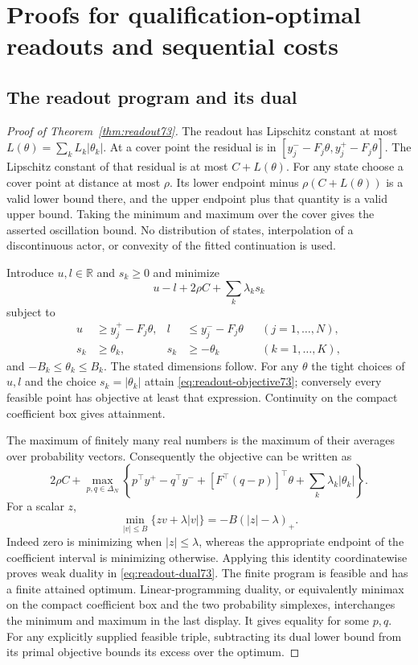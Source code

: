 \section{Proofs for qualification-optimal readouts and sequential costs}\label{supp:proofs73}
\subsection{The readout program and its dual}\label{supp:readout73}
\begin{proof}[Proof of Theorem~\ref{thm:readout73}]
The readout has Lipschitz constant at most $L(\theta)=\sum_kL_k|\theta_k|$. At a cover point the residual is in $[y_j^--F_j\theta,y_j^+-F_j\theta]$. The Lipschitz constant of that residual is at most $C+L(\theta)$. For any state choose a cover point at distance at most $\rho$. Its lower endpoint minus $\rho(C+L(\theta))$ is a valid lower bound there, and the upper endpoint plus that quantity is a valid upper bound. Taking the minimum and maximum over the cover gives the asserted oscillation bound. No distribution of states, interpolation of a discontinuous actor, or convexity of the fitted continuation is used.

Introduce $u,l\in\mathbb R$ and $s_k\ge0$ and minimize
\[
 u-l+2\rho C+\sum_k\lambda_ks_k
\]
subject to
\begin{align*}
 u&\ge y_j^+-F_j\theta,& l&\le y_j^--F_j\theta &&(j=1,\ldots,N),\\
 s_k&\ge\theta_k,&s_k&\ge-\theta_k &&(k=1,\ldots,K),
\end{align*}
and $-B_k\le\theta_k\le B_k$. The stated dimensions follow. For any $\theta$ the tight choices of $u,l$ and the choice $s_k=|\theta_k|$ attain \eqref{eq:readout-objective73}; conversely every feasible point has objective at least that expression. Continuity on the compact coefficient box gives attainment.

The maximum of finitely many real numbers is the maximum of their averages over probability vectors. Consequently the objective can be written as
\[
 2\rho C+\max_{p,q\in\Delta_N}
 \left\{p^\top y^+-q^\top y^-+
       [F^\top(q-p)]^\top\theta+\sum_k\lambda_k|\theta_k|\right\}.
\]
For a scalar $z$,
\[
 \min_{|v|\le B}\{zv+\lambda|v|\}
       =-B(|z|-\lambda)_+.
\]
Indeed zero is minimizing when $|z|\le\lambda$, whereas the appropriate endpoint of the coefficient interval is minimizing otherwise. Applying this identity coordinatewise proves weak duality in \eqref{eq:readout-dual73}. The finite program is feasible and has a finite attained optimum. Linear-programming duality, or equivalently minimax on the compact coefficient box and the two probability simplexes, interchanges the minimum and maximum in the last display. It gives equality for some $p,q$. For any explicitly supplied feasible triple, subtracting its dual lower bound from its primal objective bounds its excess over the optimum.
\end{proof}

